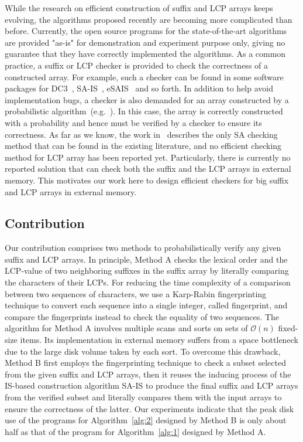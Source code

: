 \documentclass[10pt,journal,compsoc]{IEEEtran}
\begin{document}
While the research on efficient construction of suffix and LCP arrays keeps evolving, the algorithms proposed recently are becoming more complicated than before. Currently, the open source programs for the state-of-the-art algorithms are provided "as-is" for demonstration and experiment purpose only, giving no guarantee that they have correctly implemented the algorithms. As a common practice, a suffix or LCP checker is provided to check the correctness of a constructed array. For example, such a checker can be found in some software packages for DC3~\cite{Dementiev08}, SA-IS~\cite{Nong11}, eSAIS~\cite{Bingmann12} and so forth. In addition to help avoid implementation bugs, a checker is also demanded for an array constructed by a probabilistic algorithm~(e.g.~\cite{Bille2013}). In this case, the array is correctly constructed with a probability and hence must be verified by a checker to ensure its correctness. As far as we know, the work in~\cite{Burkhardt2003} describes the only SA checking method that can be found in the existing literature, and no efficient checking method for LCP array has been reported yet. Particularly, there is currently no reported solution that can check both the suffix and the LCP arrays in external memory. This motivates our work here to design efficient checkers for big suffix and LCP arrays in external memory.  

	
\subsection{Contribution}\label{sec:introduction:contribution}

Our contribution comprises two methods to probabilistically verify any given suffix and LCP arrays. In principle, Method A checks the lexical order and the LCP-value of two neighboring suffixes in the suffix array by literally comparing the characters of their LCPs. For reducing the time complexity of a comparison between two sequences of characters, we use a Karp-Rabin fingerprinting technique to convert each sequence into a single integer, called fingerprint, and compare the fingerprints instead to check the equality of two sequences. The algorithm for Method A involves multiple scans and sorts on sets of $\mathcal{O}(n)$ fixed-size items. Its implementation in external memory suffers from a space bottleneck due to the large disk volume taken by each sort. 
To overcome this drawback, Method B first employs the fingerprinting technique to check a subset selected from the given suffix and LCP arrays, then it reuses the inducing process of the IS-based construction algorithm SA-IS \cite{Nong11} to produce the final suffix and LCP arrays from the verified subset and literally compares them with the input arrays to ensure the correctness of the latter. Our experiments indicate that the peak disk use of the programs for Algorithm~\ref{alg:2} designed by Method B is only about half as that of the program for Algorithm~\ref{alg:1} designed by Method A.
\end{document}
